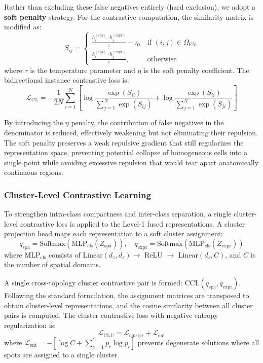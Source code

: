 \documentclass[lettersize,journal]{IEEEtran}
\begin{document}
Rather than excluding these false negatives entirely (hard exclusion), we adopt a \textbf{soft penalty} strategy. For the contrastive computation, the similarity matrix is modified as:
\begin{equation}
    S_{ij} =
    \begin{cases}
    \frac{h_i^{(\text{spa})} \cdot h_j^{(\text{expr})}}{\tau} - \eta, & \text{if } (i, j) \in \Omega_{\text{FN}} \\
    \frac{h_i^{(\text{spa})} \cdot h_j^{(\text{expr})}}{\tau}, & \text{otherwise}
    \end{cases}
\end{equation}
where $\tau$ is the temperature parameter and $\eta$ is the soft penalty coefficient. The bidirectional instance contrastive loss is:
\begin{equation}
    \mathcal{L}_{\text{CL}} = -\frac{1}{2N} \sum_{i=1}^N \left[ \log \frac{\exp(S_{ii})}{\sum_{j=1}^N \exp(S_{ij})} + \log \frac{\exp(S_{ii})}{\sum_{j=1}^N \exp(S_{ji})} \right]
\end{equation}

By introducing the $\eta$ penalty, the contribution of false negatives in the denominator is reduced, effectively weakening but not eliminating their repulsion. The soft penalty preserves a weak repulsive gradient that still regularizes the representation space, preventing potential collapse of homogeneous cells into a single point while avoiding excessive repulsion that would tear apart anatomically continuous regions.

\subsubsection{Cluster-Level Contrastive Learning}
To strengthen intra-class compactness and inter-class separation, a single cluster-level contrastive loss is applied to the Level-1 fused representations. A cluster projection head maps each representation to a soft cluster assignment:
\begin{equation}
    q_{\text{spa}} = \text{Softmax}(\text{MLP}_{\text{cls}}(Z_{\text{spa}})), \quad q_{\text{expr}} = \text{Softmax}(\text{MLP}_{\text{cls}}(Z_{\text{expr}}))
\end{equation}
where $\text{MLP}_{\text{cls}}$ consists of Linear$(d_z, d_z) \to$ ReLU $\to$ Linear$(d_z, C)$, and $C$ is the number of spatial domains.

A single cross-topology cluster contrastive pair is formed: $\text{CCL}(q_{\text{spa}}, q_{\text{expr}})$. Following the standard formulation, the assignment matrices are transposed to obtain cluster-level representations, and the cosine similarity between all cluster pairs is computed. The cluster contrastive loss with negative entropy regularization is:
\begin{equation}
    \mathcal{L}_{\text{CLU}} = \mathcal{L}_{\text{cluster}} + \mathcal{L}_{\text{ent}}
\end{equation}
where $\mathcal{L}_{\text{ent}} = -[\log C + \sum_{c=1}^{C} p_c \log p_c]$ prevents degenerate solutions where all spots are assigned to a single cluster.
\end{document}

